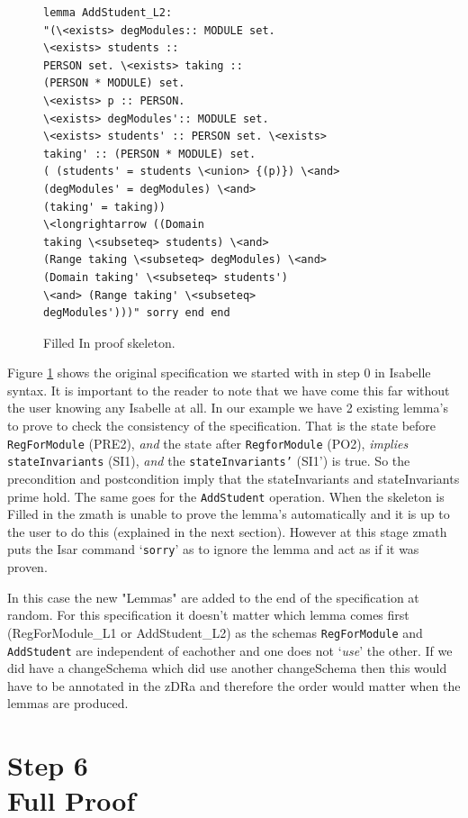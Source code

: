 \begin{figure}[H]
\begin{minipage}{0.45\textwidth}
\begin{scriptsize}
\begin{BVerbatim}
lemma AddStudent_L2: 
"(\<exists> degModules:: MODULE set. 
\<exists> students ::
PERSON set. \<exists> taking :: 
(PERSON * MODULE) set. 
\<exists> p :: PERSON.
\<exists> degModules':: MODULE set. 
\<exists> students' :: PERSON set. \<exists>
taking' :: (PERSON * MODULE) set. 
( (students' = students \<union> {(p)}) \<and>
(degModules' = degModules) \<and> 
(taking' = taking)) 
\<longrightarrow ((Domain
taking \<subseteq> students) \<and> 
(Range taking \<subseteq> degModules) \<and>
(Domain taking' \<subseteq> students') 
\<and> (Range taking' \<subseteq>
degModules')))" sorry end end
\end{BVerbatim}
\end{scriptsize}
\end{minipage}
\caption{Filled In proof skeleton. \label{fig:fillinFullexample}}
\end{figure}

Figure \ref{fig:fillinFullexample} shows the original specification we started
with in step 0 in Isabelle syntax. It is important to the reader to note that we
have come this far without the user knowing any Isabelle at all. In our example
we have 2 existing lemma's to prove to check the consistency of the
specification. That is the state before \texttt{RegForModule} (PRE2), \emph{and}
the state after \texttt{RegforModule} (PO2), \emph{implies}
\texttt{stateInvariants} (SI1), \emph{and} the \texttt{stateInvariants'} (SI1')
is true. So the precondition and postcondition imply that the stateInvariants
and stateInvariants prime hold. The same goes for the \texttt{AddStudent}
operation. When the skeleton is Filled in the \gls{zmath} is unable to prove the
lemma's automatically and it is up to the user to do this (explained in the next
section). However at this stage \gls{zmath} puts the Isar command
`\texttt{sorry}' as to ignore the lemma and act as if it was proven.

In this case the new "Lemmas" are added to the end of the specification at random.
For this specification it doesn't matter which lemma comes first (RegForModule\_L1 or AddStudent\_L2)
as the schemas \texttt{RegForModule} and \texttt{AddStudent} are independent of eachother
and one does not `\textit{use}' the other. If we did have a changeSchema which did use another changeSchema
then this would have to be annotated in the zDRa and therefore the order would matter when the lemmas are produced.


\section{Step 6\\Full Proof}


